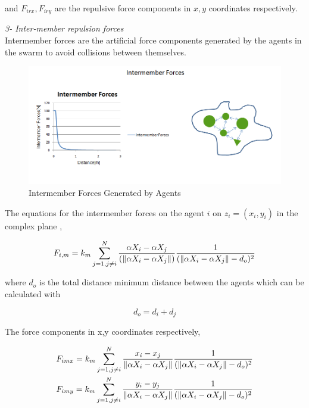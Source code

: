 and $F_{irx} , F_{iry} $ are the repulsive force components in $x,y$ coordinates respectively. \newline
						
\textit{		3- Inter-member repulsion forces} \\ 
Intermember forces are the artificial force components generated by the agents in the swarm to avoid collisions between themselves. 
			
\begin{figure}[H]
\caption{Intermember Forces Generated by Agents}
\centering
\includegraphics[scale = 0.60]{intermember_forces}
\end{figure}
			
The equations for the intermember forces on the agent $i$ on $z_i = (x_i, y_i)$  in the complex plane ,
			
\begin{equation}
F_{i,m} = k_m \sum_{j=1, j\neq i}^{N}\frac{\alpha X_i - \alpha X_j}{(\left\lVert\alpha X_i - \alpha X_j\right\rVert)} \frac{1}{(\left\lVert\alpha X_i - \alpha X_j\right\rVert - d_o)^2}
\end{equation}
			
where $d_o$ is the total distance minimum distance between the agents which can be calculated with

\begin{equation}
 d_o = d_i + d_j
\end{equation}
			
The force components in x,y coordinates respectively,

\begin{align}
\begin{split}
&F_{imx} = k_m \sum_{j=1, j\neq i}^{N}\frac{x_i- x_j}{\left\lVert\alpha X_i - \alpha X_j\right\rVert}  \frac{1}{(\left\lVert\alpha X_i - \alpha X_j\right\rVert - d_o)^2}\\
&F_{imy} = k_m \sum_{j=1, j\neq i}^{N}\frac{y_i- y_j}{\left\lVert\alpha X_i - \alpha X_j\right\rVert}  \frac{1}{(\left\lVert\alpha X_i - \alpha X_j\right\rVert - d_o)^2}\\
\end{split}
\end{align}
		
